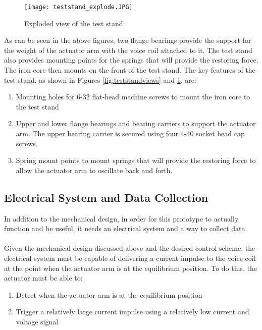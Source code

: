 \begin{figure}[h!]
\centering
\texttt{[image: teststand\_explode.JPG]}
\caption{Exploded view of the test stand}
\label{fig:teststand_explode}
\end{figure}

\noindent As can be seen in the above figures, two flange bearings provide the support for the weight of the actuator arm with the voice coil attached to it. The test stand also provides mounting points for the springs that will provide the restoring force. The iron core then mounts on the front of the test stand. The key features of the test stand, as shown in Figures \ref{fig:teststandviews} and \ref{fig:teststand_explode}, are:

\begin{enumerate}
\item Mounting holes for 6-32 flat-head machine screws to mount the iron core to the test stand
\item Upper and lower flange bearings and bearing carriers to support the actuator arm. The upper bearing carrier is secured using four 4-40 socket head cap screws.
\item Spring mount points to mount springs that will provide the restoring force to allow the actuator arm to oscillate back and forth.
\end{enumerate}



\subsection{Electrical System and Data Collection}
In addition to the mechanical design, in order for this prototype to actually function and be useful, it needs an electrical system and a way to collect data.\\ \\
%
Given the mechanical design discussed above and the desired control scheme, the electrical system must be capable of delivering a current impulse to the voice coil at the point when the actuator arm is at the equilibrium position. To do this, the actuator must be able to:

\begin{enumerate}
\item Detect when the actuator arm is at the equilibrium position
\item Trigger a relatively large current impulse using a relatively low current and voltage signal
\end{enumerate}

